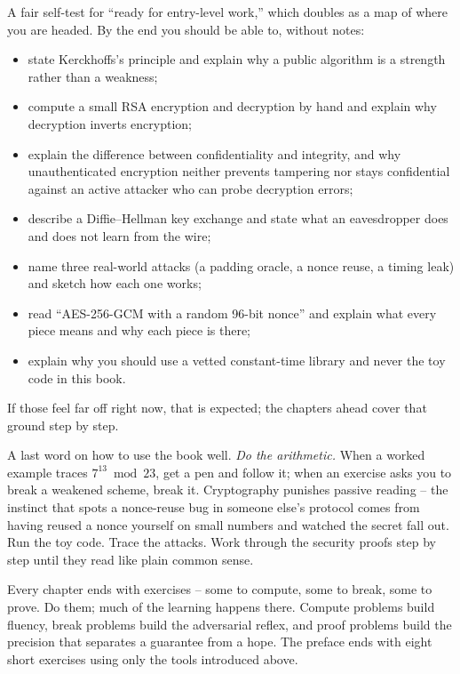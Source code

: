 \begin{recoverybox}
A fair self-test for ``ready for entry-level work,'' which doubles as a map of where you are headed. By the end you should be able to, without notes:

\begin{itemize}
  \item state Kerckhoffs's principle and explain why a public algorithm is a strength rather than a weakness;
  \item compute a small RSA encryption and decryption by hand and explain why decryption inverts encryption;
  \item explain the difference between confidentiality and integrity, and why unauthenticated encryption neither prevents tampering nor stays confidential against an active attacker who can probe decryption errors;
  \item describe a Diffie--Hellman key exchange and state what an eavesdropper does and does not learn from the wire;
  \item name three real-world attacks (a padding oracle, a nonce reuse, a timing leak) and sketch how each one works;
  \item read ``AES-256-GCM with a random 96-bit nonce'' and explain what every piece means and why each piece is there;
  \item explain why you should use a vetted constant-time library and never the toy code in this book.
\end{itemize}

If those feel far off right now, that is expected; the chapters ahead cover that ground step by step.
\end{recoverybox}

A last word on how to use the book well. \emph{Do the arithmetic.} When a worked example traces $7^{13} \bmod 23$, get a pen and follow it; when an exercise asks you to break a weakened scheme, break it. Cryptography punishes passive reading -- the instinct that spots a nonce-reuse bug in someone else's protocol comes from having reused a nonce yourself on small numbers and watched the secret fall out. Run the toy code. Trace the attacks. Work through the security proofs step by step until they read like plain common sense.

Every chapter ends with exercises -- some to compute, some to break, some to prove. Do them; much of the learning happens there. Compute problems build fluency, break problems build the adversarial reflex, and proof problems build the precision that separates a guarantee from a hope. The preface ends with eight short exercises using only the tools introduced above.

